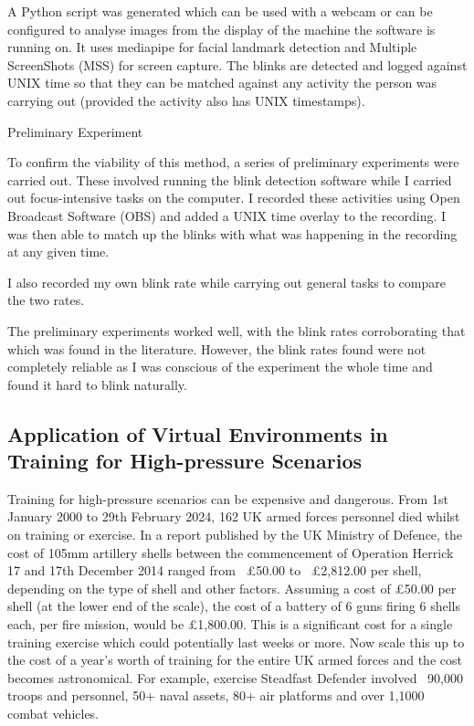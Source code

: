\documentclass[12pt]{article}
\begin{document}
A Python script was generated which can be used with a webcam or can be configured to analyse images from the display of the machine the software is running on. It uses mediapipe for facial landmark detection and Multiple ScreenShots (MSS) for screen capture. The blinks are detected and logged against UNIX time so that they can be matched against any activity the person was carrying out (provided the activity also has UNIX timestamps).

Preliminary Experiment

To confirm the viability of this method, a series of preliminary experiments were carried out. These involved running the blink detection software while I carried out focus-intensive tasks on the computer. I recorded these activities using Open Broadcast Software (OBS) and added a UNIX time overlay to the recording. I was then able to match up the blinks with what was happening in the recording at any given time. 

I also recorded my own blink rate while carrying out general tasks to compare the two rates. 

The preliminary experiments worked well, with the blink rates corroborating that which was found in the literature. However, the blink rates found were not completely reliable as I was conscious of the experiment the whole time and found it hard to blink naturally.



\subsection{Application of Virtual Environments in Training for High-pressure Scenarios} \label{sec:applicationsOfVirtualEnvironments}

Training for high-pressure scenarios can be expensive and dangerous. From 1st January 2000 to 29th February 2024, 162 UK armed forces personnel died whilst on training or exercise. \cite{ukmod2024} In a report published by the UK Ministry of Defence, the cost of 105mm artillery shells between the commencement of Operation Herrick 17 and 17th December 2014 ranged from ~£50.00 to ~£2,812.00 per shell, depending on the type of shell and other factors. \cite{ukmod2015} Assuming a cost of £50.00 per shell (at the lower end of the scale), the cost of a battery of 6 guns firing 6 shells each, per fire mission, would be £1,800.00. This is a significant cost for a single training exercise which could potentially last weeks or more. Now scale this up to the cost of a year's worth of training for the entire UK armed forces and the cost becomes astronomical. For example, exercise Steadfast Defender involved ~90,000 troops and personnel, 50+ naval assets, 80+ air platforms and over 1,1000 combat vehicles. \cite{steadfastdefender24}
\end{document}
